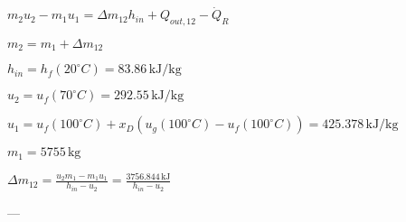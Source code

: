 \( m_2 u_2 - m_1 u_1 = \Delta m_{12} h_{in} + Q_{out,12} - \dot{Q}_{R} \)  

\( m_2 = m_1 + \Delta m_{12} \)  

\( h_{in} = h_f(20^\circ C) = 83.86 \, \text{kJ/kg} \)  

\( u_2 = u_f(70^\circ C) = 292.55 \, \text{kJ/kg} \)  

\( u_1 = u_f(100^\circ C) + x_D (u_g(100^\circ C) - u_f(100^\circ C)) = 425.378 \, \text{kJ/kg} \)  

\( m_1 = 5755 \, \text{kg} \)  

\( \Delta m_{12} = \frac{u_2 m_1 - m_1 u_1}{h_{in} - u_2} = \frac{3756.844 \, \text{kJ}}{h_{in} - u_2} \)  

---